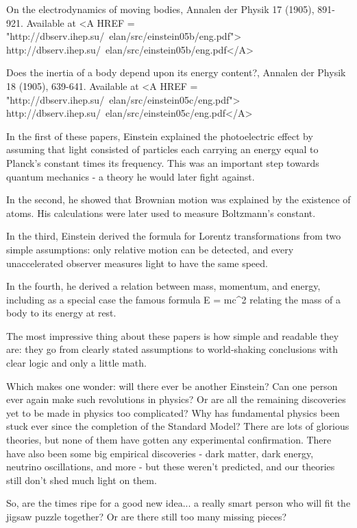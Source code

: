    On the electrodynamics of moving bodies, Annalen der Physik 17 (1905), 891-921.  
   Available at 
   <A HREF = "http://dbserv.ihep.su/~elan/src/einstein05b/eng.pdf"> http://dbserv.ihep.su/~elan/src/einstein05b/eng.pdf</A>

   Does the inertia of a body depend upon its energy content?, 
   Annalen der Physik 18 (1905), 639-641.  Available at 
   <A HREF = "http://dbserv.ihep.su/~elan/src/einstein05c/eng.pdf">
   http://dbserv.ihep.su/~elan/src/einstein05c/eng.pdf</A>

In the first of these papers, Einstein explained the photoelectric effect by 
assuming that light consisted of particles each carrying an energy equal to 
Planck's constant times its frequency.  This was an important step towards 
quantum mechanics - a theory he would later fight against.  

In the second, he showed that Brownian motion was explained by the existence 
of atoms.  His calculations were later used to measure Boltzmann's constant.

In the third, Einstein derived the formula for Lorentz transformations from 
two simple assumptions: only relative motion can be detected, and every 
unaccelerated observer measures light to have the same speed.

In the fourth, he derived a relation between mass, momentum, and energy, including 
as a special case the famous formula E = mc^{2} relating the mass of a body to its 
energy at rest.

The most impressive thing about these papers is how simple and readable they are: 
they go from clearly stated assumptions to world-shaking conclusions with clear 
logic and only a little math.  

Which makes one wonder: will there ever be another Einstein?  Can one person ever
again make such revolutions in physics?  Or are all the remaining discoveries yet
to be made in physics too complicated?  Why has fundamental physics been stuck 
ever since the completion of the Standard Model?  There are lots of glorious  
theories, but none of them have gotten any experimental confirmation.  There have
also been some big empirical discoveries - dark matter, dark energy, neutrino
oscillations, and more - but these weren't predicted, and our theories still 
don't shed much light on them.  

So, are the times ripe for a good new idea... a really smart person who will
fit the jigsaw puzzle together?  Or are there still too many missing pieces?

